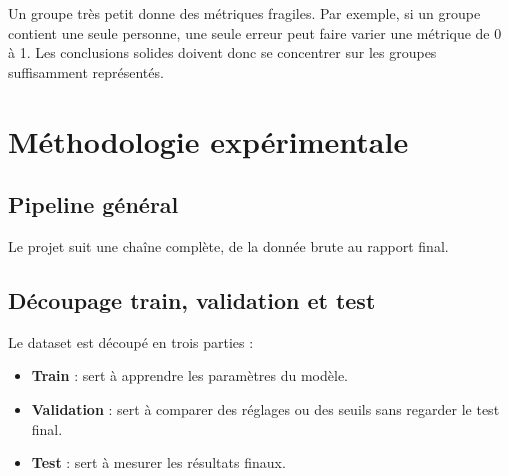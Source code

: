 \documentclass[12pt,a4paper]{report}
\begin{document}
\begin{tcolorbox}[infobox]
Un groupe très petit donne des métriques fragiles. Par exemple, si un groupe contient une seule personne, une seule erreur peut faire varier une métrique de 0 à 1. Les conclusions solides doivent donc se concentrer sur les groupes suffisamment représentés.
\end{tcolorbox}

\chapter{Méthodologie expérimentale}

\section{Pipeline général}

Le projet suit une chaîne complète, de la donnée brute au rapport final.

\begin{center}
\end{center}

\section{Découpage train, validation et test}

Le dataset est découpé en trois parties :

\begin{itemize}
  \item \textbf{Train} : sert à apprendre les paramètres du modèle.
  \item \textbf{Validation} : sert à comparer des réglages ou des seuils sans regarder le test final.
  \item \textbf{Test} : sert à mesurer les résultats finaux.
\end{itemize}
\end{document}
